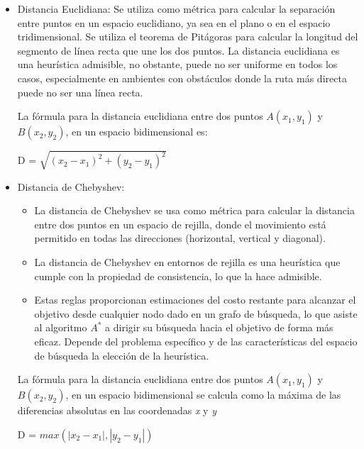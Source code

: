 \begin{itemize}
    \item Distancia Euclidiana:
        Se utiliza como métrica para calcular la separación entre puntos en un espacio euclidiano, 
        ya sea en el plano o en el espacio tridimensional. Se utiliza el teorema de Pitágoras para 
        calcular la longitud del segmento de línea recta que une los dos puntos. La distancia 
        euclidiana es una heurística admisible, no obstante, puede no ser uniforme en todos los 
        casos, especialmente en ambientes con obstáculos donde la ruta más directa puede no ser 
        una línea recta.

        La fórmula para la distancia euclidiana entre dos puntos $A(x_1, y_1)$ y $B(x_2,y_2)$, 
        en un espacio bidimensional es:
        \begin{center}
            D = $\sqrt{(x_2 - x_1)^2 + (y_2 - y_1)^2}$
        \end{center}

    \item  Distancia de Chebyshev:
        \begin{itemize}
            \item La distancia de Chebyshev se usa como métrica para calcular la distancia entre 
                    dos puntos en un espacio de rejilla, donde el movimiento está permitido en todas 
                    las direcciones (horizontal, vertical y diagonal).
            \item La distancia de Chebyshev en entornos de rejilla es una heurística que cumple 
                    con la propiedad de consistencia, lo que la hace admisible.
            \item Estas reglas proporcionan estimaciones del costo restante para alcanzar el 
                    objetivo desde cualquier nodo dado en un grafo de búsqueda, lo que asiste 
                    al algoritmo $A^{*}$ a dirigir su búsqueda hacia el objetivo de forma más 
                    eficaz. Depende del problema específico y de las características del 
                    espacio de búsqueda la elección de la heurística.
        \end{itemize}
        
        La fórmula para la distancia euclidiana entre dos puntos $A(x_1, y_1)$ y $B(x_2,y_2)$, en un espacio bidimensional se calcula como la máxima de las diferencias absolutas en las coordenadas \textit{x} y \textit{y}
        \begin{center}
            D = $max(|x_2 - x_1|,|y_2 - y_1|)$
        \end{center}
\end{itemize}
